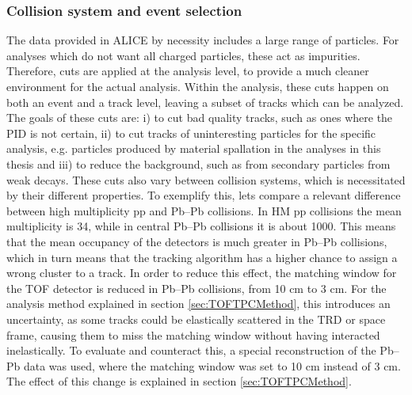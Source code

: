 \subsubsection{Collision system and event selection}
The data provided in ALICE by necessity includes a large range of particles. For analyses which do not want all charged particles, these act as impurities. Therefore, cuts are applied at the analysis level, to provide a much cleaner environment for the actual analysis. Within the analysis, these cuts happen on both an event and a track level, leaving a subset of tracks which can be analyzed. The goals of these cuts are: i) to cut bad quality tracks, such as ones where the PID is not certain, ii) to cut tracks of uninteresting particles for the specific analysis, e.g. particles produced by material spallation in the analyses in this thesis and iii) to reduce the background, such as from secondary particles from weak decays. These cuts also vary between collision systems, which is necessitated by their different properties. To exemplify this, lets compare a relevant difference between high multiplicity pp and Pb--Pb collisions. In HM pp collisions the mean multiplicity is 34, while in central Pb--Pb collisions it is about 1000. This means that the mean occupancy of the detectors is much greater in Pb--Pb collisions, which in turn means that the tracking algorithm has a higher chance to assign a wrong cluster to a track. In order to reduce this effect, the matching window for the TOF detector is reduced in Pb--Pb collisions, from 10 cm to 3 cm. For the analysis method explained in section \ref{sec:TOFTPCMethod}, this introduces an uncertainty, as some tracks could be elastically scattered in the TRD or space frame, causing them to miss the matching window without having interacted inelastically.  To evaluate and counteract this, a special reconstruction of the Pb--Pb data was used, where the matching window was set to 10 cm instead of 3 cm. The effect of this change is explained in section \ref{sec:TOFTPCMethod}. \\

